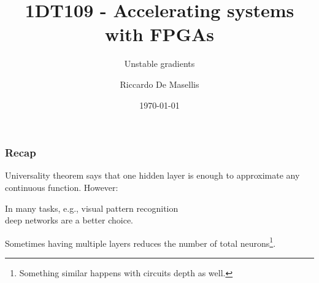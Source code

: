 \documentclass[usenames,dvipsnames]{beamer}
\title{1DT109 - Accelerating systems with FPGAs}
\subtitle{Unstable gradients}
\author[R.\ De Masellis]{Riccardo De Masellis}
\date[]{\today}
\institute[uu.se]{Uppsala University}
\begin{document}
\begin{frame}[plain]
  \titlepage
\end{frame}
\begin{frame}
   \frametitle{Recap}
   
   Universality theorem says that one hidden layer is enough to approximate any continuous function. However:
  
  \vfill
  
  \begin{ntblock}
  \centering
  In many tasks, e.g., visual pattern recognition \\ deep networks are a better choice.
  \end{ntblock}
  
  \vfill
  
  \flushleft
Sometimes having multiple layers reduces the number of total neurons\footnote{Something similar happens with circuits depth as well.}.
  
\end{frame}
\end{document}
